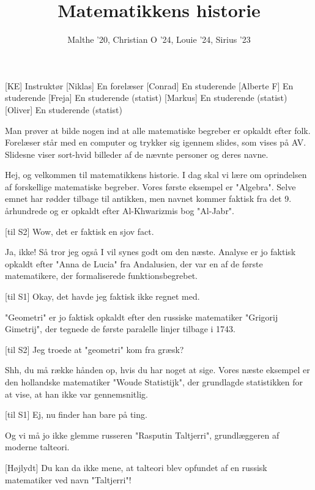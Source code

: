 \documentclass[a4paper, 11pt]{article}
\title{Matematikkens historie}
\author{Malthe '20, Christian O '24, Louie '24, Sirius '23}
\begin{document}
\maketitle

\begin{roles}  
[KE] Instruktør
[Niklas] En forelæser
[Conrad] En studerende
[Alberte F] En studerende
[Freja] En studerende (statist)
[Markus] En studerende (statist)
[Oliver] En studerende (statist)
\end{roles}

\begin{sketch}
\scene Man prøver at bilde nogen ind at alle matematiske begreber er opkaldt efter folk. Forelæser står med en computer og trykker sig igennem slides, som vises på AV. Slidesne viser sort-hvid billeder af de nævnte personer og deres navne.

 Hej, og velkommen til matematikkens historie. I dag skal vi lære om oprindelsen af forskellige matematiske begreber. Vores første eksempel er "Algebra". Selve emnet har rødder tilbage til antikken, men navnet kommer faktisk fra det 9. århundrede og er opkaldt efter Al-Khwarizmis bog "Al-Jabr". 

[til S2] Wow, det er faktisk en sjov fact.   

 Ja, ikke! Så tror jeg også I vil synes godt om den næste. Analyse er jo faktisk opkaldt efter "Anna de Lucia" fra Andalusien, der var en af de første matematikere, der formaliserede funktionsbegrebet.

[til S1] Okay, det havde jeg faktisk ikke regnet med.

 "Geometri" er jo faktisk opkaldt efter den russiske matematiker "Grigorij Gimetrij", der tegnede de første paralelle linjer tilbage i 1743. 

[til S2] Jeg troede at "geometri" kom fra græsk?

 Shh, du må række hånden op, hvis du har noget at sige. Vores næste eksempel er den hollandske matematiker "Woude Statistijk", der grundlagde statistikken for at vise, at han ikke var gennemsnitlig. 

[til S1] Ej, nu finder han bare på ting.

 Og vi må jo ikke glemme russeren "Rasputin Taltjerri", grundlæggeren af moderne talteori. 

[Højlydt] Du kan da ikke mene, at talteori blev opfundet af en russisk matematiker ved navn "Taltjerri"!


\end{sketch}
\end{document}
